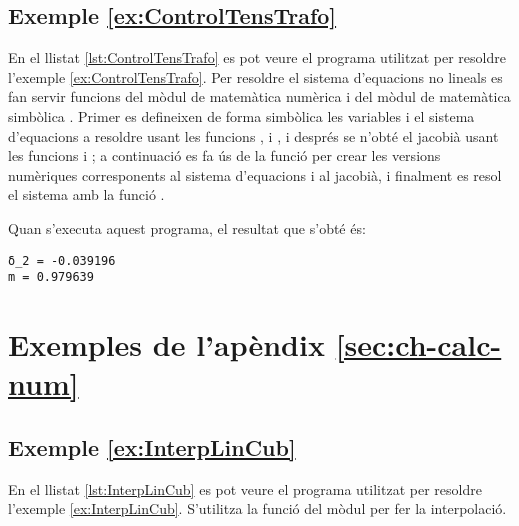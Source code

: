 \hypertarget{exemple:ControlTensTrafo}{\subsection{Exemple \ref*{ex:ControlTensTrafo} \ControlTensTrafo}}
En el llistat \vref{lst:ControlTensTrafo} es pot veure el programa utilitzat per resoldre l'exemple \vref{ex:ControlTensTrafo}. Per resoldre el sistema d'equacions no lineals  es fan servir funcions  del mòdul de matemàtica numèrica  i del mòdul de matemàtica simbòlica . Primer es defineixen de forma simbòlica les variables i el sistema d'equacions a resoldre usant les funcions ,  i , i després se n'obté el jacobià usant les funcions  i ; a continuació es fa ús de la funció   per crear les versions numèriques corresponents al sistema d'equacions i al jacobià, i finalment es resol el sistema amb la funció .


Quan s'executa aquest programa, el resultat que s'obté és:
\lstset{
	language=,
	numbers=none,
	frame=none
}
\begin{lstlisting}
δ_2 = -0.039196
m = 0.979639
\end{lstlisting}




\section{Exemples de l'apèndix \ref*{sec:ch-calc-num}}

\hypertarget{exemple:InterpLinCub}{\subsection{Exemple \ref*{ex:InterpLinCub} \InterpLinCub}}
En el llistat \vref{lst:InterpLinCub} es pot veure el programa utilitzat per resoldre l'exemple \vref{ex:InterpLinCub}. S'utilitza la funció  del mòdul  per fer la interpolació.



